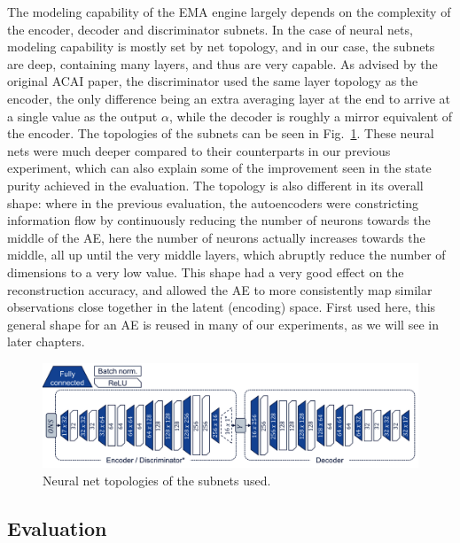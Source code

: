 			The modeling capability of the \ac{EMA} engine largely depends on the complexity of the encoder, decoder and discriminator subnets.
			In the case of neural nets, modeling capability is mostly set by net topology, and in our case, the subnets are deep, containing many layers, and thus are very capable. 
			As advised by the original \ac{ACAI} paper, the discriminator used the same layer topology as the encoder, the only difference being an extra averaging layer at the end to arrive at a single value as the output $\alpha$, while the decoder is roughly a mirror equivalent of the encoder.
			The topologies of the subnets can be seen in Fig.~\ref{fig:acai_topology}.
			These neural nets were much deeper compared to their counterparts in our previous experiment, which can also explain some of the improvement seen in the state purity achieved in the evaluation.
			The topology is also different in its overall shape: where in the previous evaluation, the autoencoders were constricting information flow by continuously reducing the number of neurons towards the middle of the \ac{AE}, here the number of neurons actually increases towards the middle, all up until the very middle layers, which abruptly reduce the number of dimensions to a very low value.
			This shape had a very good effect on the reconstruction accuracy, and allowed the \ac{AE} to more consistently map similar observations close together in the latent (encoding) space.
			First used here, this general shape for an \ac{AE} is reused in many of our experiments, as we will see in later chapters.
			
			\begin{figure}[ht]
				\centering
				\includegraphics[width=\linewidth]{figures/04_ema/acai_topology/acai_topology.pdf}
				\caption[AE topologies in the renewed evaluation]{Neural net topologies of the subnets used.}
				\label{fig:acai_topology}
			\end{figure}
			
		\subsection{Evaluation}
			
